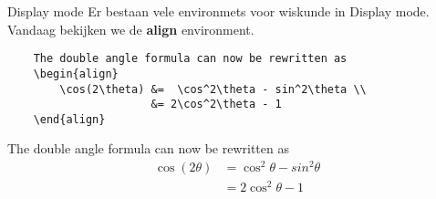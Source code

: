 \copyrightTim

\begin{frame}[fragile]{Display mode}
    Er bestaan vele environmets voor wiskunde in Display mode. Vandaag bekijken we de \textbf{align} environment.

    \begin{verbatim}
    The double angle formula can now be rewritten as   
    \begin{align}
        \cos(2\theta) &=  \cos^2\theta - sin^2\theta \\
                      &= 2\cos^2\theta - 1 
    \end{align}
\end{verbatim}
The double angle formula can now be rewritten as
    \begin{align}
        \cos(2\theta) &=  \cos^2\theta - sin^2\theta \\
                      &= 2\cos^2\theta - 1 
    \end{align}


\end{frame}